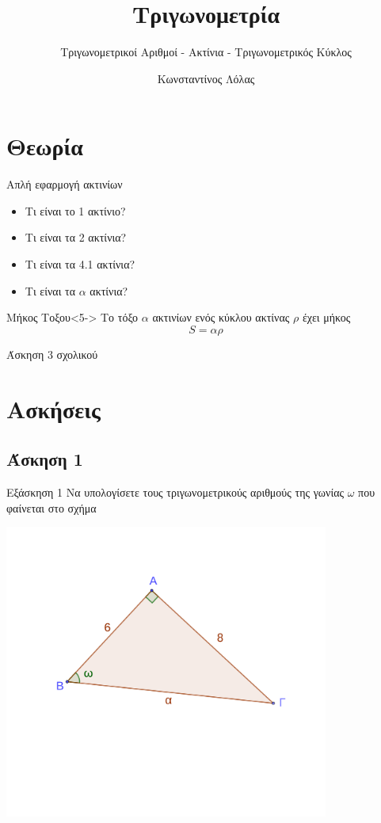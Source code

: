\documentclass[greek]{beamer}
\title{Τριγωνομετρία}
\subtitle{Τριγωνομετρικοί Αριθμοί - Ακτίνια - Τριγωνομετρικός Κύκλος}
\author[Λόλας]{Κωνσταντίνος Λόλας}
\date{}
\begin{document}
\begin{frame}
 \titlepage
\end{frame}

\section{Θεωρία}
\begin{frame}{Απλή εφαρμογή ακτινίων}
 \begin{itemize}
  \item<1-> Τι είναι το 1 ακτίνιο?
  \item<2-> Τι είναι τα 2 ακτίνια?
  \item<3-> Τι είναι τα 4.1 ακτίνια?
  \item<4-> Τι είναι τα $α$ ακτίνια?
 \end{itemize}
 \begin{block}{Μήκος Τοξου}<5->
  Το τόξο $α$ ακτινίων ενός κύκλου ακτίνας $ρ$ έχει μήκος
  $$S=αρ$$
 \end{block}
  Άσκηση 3 σχολικού
\end{frame}

\section{Ασκήσεις}
\subsection{Άσκηση 1}
\begin{frame}[label=Άσκηση1]{Εξάσκηση 1}
 Να υπολογίσετε τους τριγωνομετρικούς αριθμούς της γωνίας $ω$ που φαίνεται στο σχήμα

 \centering
 \includegraphics[width=0.8\textwidth]{"./images/3.1.1_1.png"}

\end{frame}
\end{document}
